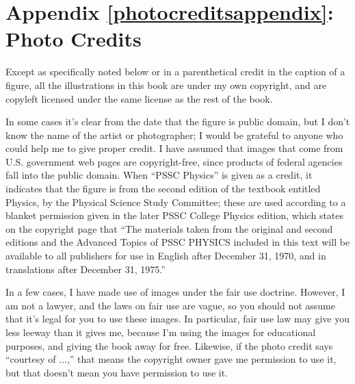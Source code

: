 \label{photocreditsappendix}%
\appendix\chapter{Appendix \ref{photocreditsappendix}: Photo Credits}
Except as specifically noted below or in a parenthetical credit in the
caption of a figure, all the illustrations in this book are
under my own copyright, and are copyleft licensed under the same license
as the rest of the book. 

In some cases it's clear from the date that the
figure is public domain, but I don't know the name of the artist or photographer; I would
be grateful to anyone who could help me to give proper credit.
I have assumed that images
that come from U.S. government web pages are copyright-free, since products
of federal agencies fall into the public domain.
When ``PSSC Physics'' is given as a credit, it indicates that the figure
is from the second edition of the textbook entitled Physics, by the
Physical Science Study Committee; these are used according to a blanket
permission given in the later PSSC College Physics edition, which states
on the copyright page that ``The materials taken from the original and second
editions and the Advanced Topics of PSSC PHYSICS included in this text
will be available to all publishers for use in English after December 31, 1970,
and in translations after December 31, 1975.'' 

In a few cases, I have made use of images under the fair use doctrine. However,
I am not a lawyer, and the laws on fair use are vague, so you should not assume
that it's legal for you to use these images. In particular, fair use law may
give you less leeway than it gives me, because I'm using the images for
educational purposes, and giving the book away for free. Likewise, if the
photo credit says ``courtesy of ...,'' that means the copyright owner gave
me permission to use it, but that doesn't mean you have permission to use it.

\newcommand{\cred}[3]{\textbf{\pageref{#1}} \emph{#2:} #3.\quad}
\newcommand{\credtwo}[4]{\textbf{\pageref{#1},\pageref{#2}} \emph{#3:} #4.\quad}
\newcommand{\credthree}[5]{\textbf{\pageref{#1},\pageref{#2},\pageref{#3}} \emph{#4:} #5.\quad}

